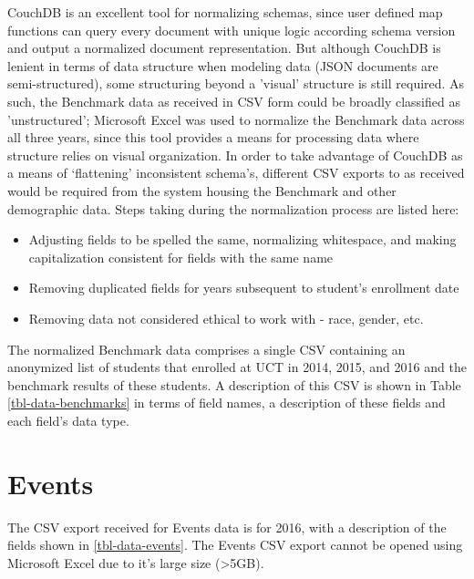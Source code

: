 CouchDB is an excellent tool for normalizing schemas, since user defined map functions can query every document with unique logic according schema version and output a normalized document representation. But although CouchDB is lenient in terms of data structure when modeling data (JSON documents are semi-structured), some structuring beyond a 'visual' structure is still required. As such, the Benchmark data as received in CSV form could be broadly classified as 'unstructured'; Microsoft Excel was used to normalize the Benchmark data across all three years, since this tool provides a means for processing data where structure relies on visual organization. In order to take advantage of CouchDB as a means of `flattening' inconsistent schema's, different CSV exports to as received would be required from the system housing the Benchmark and other demographic data. Steps taking during the normalization process are listed here:

\begin{itemize}
    \item Adjusting fields to be spelled the same, normalizing whitespace, and making capitalization consistent for fields with the same name
    \item Removing duplicated fields for years subsequent to student's enrollment date
    \item Removing data not considered ethical to work with - race, gender, etc.
\end{itemize}

The normalized Benchmark data comprises a single CSV containing an anonymized list of students that enrolled at UCT in 2014, 2015, and 2016 and the benchmark results of these students. A description of this CSV is shown in Table \ref{tbl-data-benchmarks} in terms of field names, a description of these fields and each field's data type.

\section{Events}
The CSV export received for Events data is for 2016, with a description of the fields shown in \ref{tbl-data-events}. The Events CSV export cannot be opened using Microsoft Excel due to it's large size (\textgreater 5GB).

